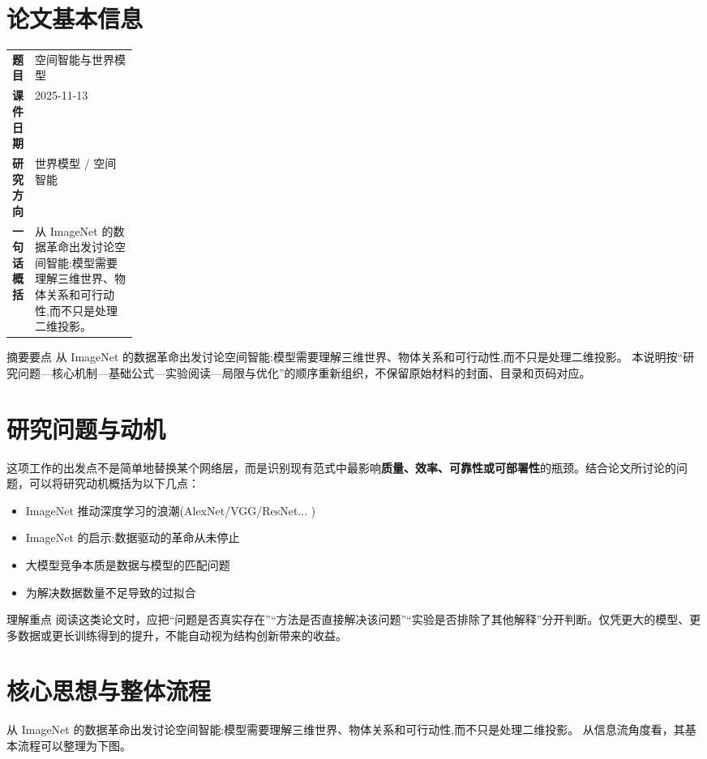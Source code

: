 \documentclass[UTF8,11pt,a4paper]{ctexart}
\newcommand{\term}[1]{\textbf{\textcolor{mainblue}{#1}}}
\begin{document}
\section{论文基本信息}
\begin{center}
\begin{tabularx}{0.94\linewidth}{>{\bfseries}p{0.18\linewidth}X}
\toprule
题目 & 空间智能与世界模型\\
课件日期 & 2025-11-13\\
研究方向 & 世界模型 / 空间智能\\
一句话概括 & 从 ImageNet 的数据革命出发讨论空间智能:模型需要理解三维世界、物体关系和可行动性,而不只是处理二维投影。\\
\bottomrule
\end{tabularx}
\end{center}

\begin{infobox}{摘要要点}
从 ImageNet 的数据革命出发讨论空间智能:模型需要理解三维世界、物体关系和可行动性,而不只是处理二维投影。 本说明按“研究问题—核心机制—基础公式—实验阅读—局限与优化”的顺序重新组织，不保留原始材料的封面、目录和页码对应。
\end{infobox}

\section{研究问题与动机}
这项工作的出发点不是简单地替换某个网络层，而是识别现有范式中最影响\term{质量、效率、可靠性或可部署性}的瓶颈。结合论文所讨论的问题，可以将研究动机概括为以下几点：
\begin{itemize}
\item ImageNet 推动深度学习的浪潮(AlexNet/VGG/ResNet... )
\item ImageNet 的启示:数据驱动的革命从未停止
\item 大模型竞争本质是数据与模型的匹配问题
\item 为解决数据数量不足导致的过拟合
\end{itemize}

\begin{notebox}{理解重点}
阅读这类论文时，应把“问题是否真实存在”“方法是否直接解决该问题”“实验是否排除了其他解释”分开判断。仅凭更大的模型、更多数据或更长训练得到的提升，不能自动视为结构创新带来的收益。
\end{notebox}

\section{核心思想与整体流程}
从 ImageNet 的数据革命出发讨论空间智能:模型需要理解三维世界、物体关系和可行动性,而不只是处理二维投影。 从信息流角度看，其基本流程可以整理为下图。
\end{document}
